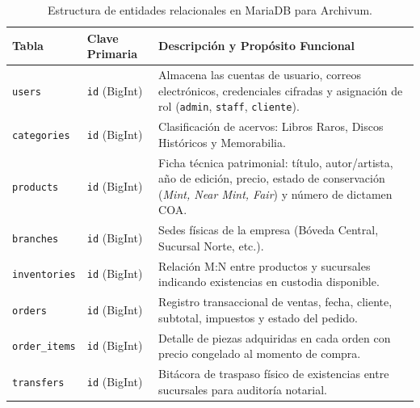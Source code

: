 \begin{table}[H]
\centering
\small
\begin{tabularx}{\textwidth}{|l|l|X|}
\hline
\textbf{Tabla} & \textbf{Clave Primaria} & \textbf{Descripción y Propósito Funcional} \\ \hline
\texttt{users} & \texttt{id} (BigInt) & Almacena las cuentas de usuario, correos electrónicos, credenciales cifradas y asignación de rol (\texttt{admin}, \texttt{staff}, \texttt{cliente}). \\ \hline
\texttt{categories} & \texttt{id} (BigInt) & Clasificación de acervos: Libros Raros, Discos Históricos y Memorabilia. \\ \hline
\texttt{products} & \texttt{id} (BigInt) & Ficha técnica patrimonial: título, autor/artista, año de edición, precio, estado de conservación (\textit{Mint, Near Mint, Fair}) y número de dictamen COA. \\ \hline
\texttt{branches} & \texttt{id} (BigInt) & Sedes físicas de la empresa (Bóveda Central, Sucursal Norte, etc.). \\ \hline
\texttt{inventories} & \texttt{id} (BigInt) & Relación M:N entre productos y sucursales indicando existencias en custodia disponible. \\ \hline
\texttt{orders} & \texttt{id} (BigInt) & Registro transaccional de ventas, fecha, cliente, subtotal, impuestos y estado del pedido. \\ \hline
\texttt{order\_items} & \texttt{id} (BigInt) & Detalle de piezas adquiridas en cada orden con precio congelado al momento de compra. \\ \hline
\texttt{transfers} & \texttt{id} (BigInt) & Bitácora de traspaso físico de existencias entre sucursales para auditoría notarial. \\ \hline
\end{tabularx}
\caption{Estructura de entidades relacionales en MariaDB para Archivum.}
\label{tab:estructura_bd}
\end{table}


